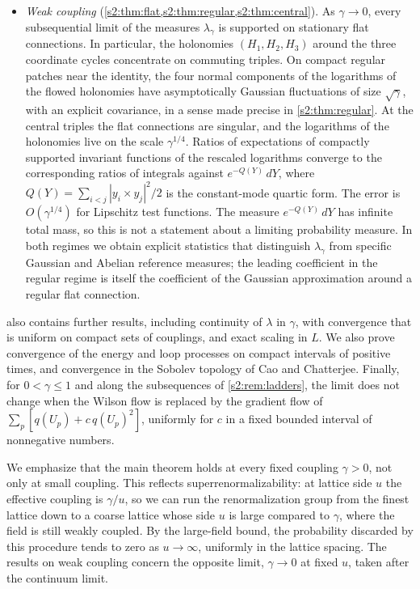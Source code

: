 \begin{itemize}
\item \emph{Weak coupling} (\cref{s2:thm:flat,s2:thm:regular,s2:thm:central}). As $\gamma\to0$, every subsequential limit of the measures $\lambda_\gamma$ is supported on stationary flat connections. In particular, the holonomies $(H_1,H_2,H_3)$ around the three coordinate cycles concentrate on commuting triples. On compact regular patches near the identity, the four normal components of the logarithms of the flowed holonomies have asymptotically Gaussian fluctuations of size $\sqrt\gamma$, with an explicit covariance, in a sense made precise in \cref{s2:thm:regular}. At the central triples the flat connections are singular, and the logarithms of the holonomies live on the scale $\gamma^{1/4}$. Ratios of expectations of compactly supported invariant functions of the rescaled logarithms converge to the corresponding ratios of integrals against $e^{-Q(Y)}\,dY$, where $Q(Y)=\sum_{i<j}|y_i\times y_j|^2/2$ is the constant-mode quartic form. The error is $O(\gamma^{1/4})$ for Lipschitz test functions. The measure $e^{-Q(Y)}\,dY$ has infinite total mass, so this is not a statement about a limiting probability measure. In both regimes we obtain explicit statistics that distinguish $\lambda_\gamma$ from specific Gaussian and Abelian reference measures; the leading coefficient in the regular regime is itself the coefficient of the Gaussian approximation around a regular flat connection.
\end{itemize}

 also contains further results, including continuity of $\lambda$ in $\gamma$, with convergence that is uniform on compact sets of couplings, and exact scaling in $L$. We also prove convergence of the energy and loop processes on compact intervals of positive times, and convergence in the Sobolev topology of Cao and Chatterjee. Finally, for $0<\gamma\le1$ and along the subsequences of \cref{s2:rem:ladders}, the limit does not change when the Wilson flow is replaced by the gradient flow of $\sum_p[q(U_p)+c\,q(U_p)^2]$, uniformly for $c$ in a fixed bounded interval of nonnegative numbers.

We emphasize that the main theorem holds at every fixed coupling $\gamma>0$, not only at small coupling. This reflects superrenormalizability: at lattice side $u$ the effective coupling is $\gamma/u$, so we can run the renormalization group from the finest lattice down to a coarse lattice whose side $u$ is large compared to $\gamma$, where the field is still weakly coupled. By the large-field bound, the probability discarded by this procedure tends to zero as $u\to\infty$, uniformly in the lattice spacing. The results on weak coupling concern the opposite limit, $\gamma\to0$ at fixed $u$, taken after the continuum limit.

